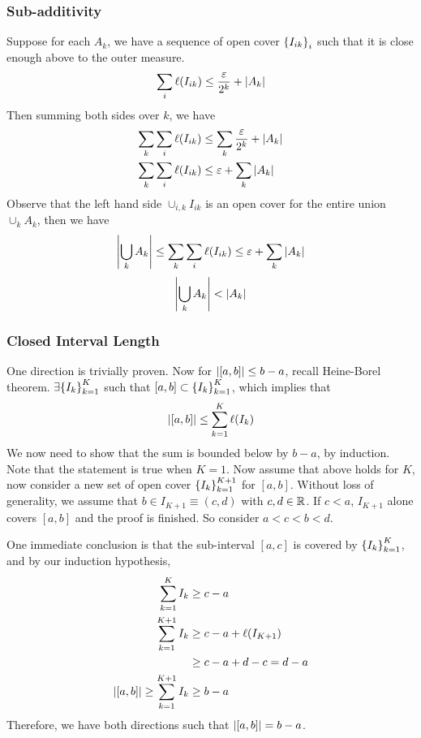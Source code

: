 \subsubsection{Sub-additivity}
\label{prof:subadditivity}
\begin{prf*}
Suppose for each $A_k$, we have a sequence of open cover $\qty{I_{ik}}_i$ such that it is close enough above to the outer measure. 
$$\sum_{i} \ell(I_{ik}) \leq \frac{{\varepsilon}}{2^k} + \abs{A_k}$$
Then summing both sides over $k$, we have
\begin{align*}
	\sum_{k}\sum_{i} \ell(I_{ik}) &\leq \sum_{k} \frac{{\varepsilon}}{2^k} + \abs{A_k}\\
	\sum_{k}\sum_{i} \ell(I_{ik}) &\leq {\varepsilon} + \sum_{k}\abs{A_k}
\end{align*}
Observe that the left hand side $\cup_{i, k} I_{ik}$ is an open cover for the entire union $\cup_k A_k$, then we have
$$ \abs{\bigcup_k A_k} \leq \sum_{k}\sum_{i} \ell(I_{ik}) \leq {\varepsilon} + \sum_{k}\abs{A_k}$$
$$\abs{\bigcup_k A_k} < \abs{A_k}$$
\end{prf*}

\subsubsection{Closed Interval Length}
\label{prof:closed interval}

\begin{prf*}
One direction is trivially proven. Now for $\abs{[a, b]} \leq b - a$, recall Heine-Borel theorem. $\exists \qty{I_k}_{k=1}^K$ such that $[a, b]\subset \qty{I_k}_{k=1}^K$, which implies that 
$$\abs{[a,b]} \leq \sum_{k=1}^K \ell(I_k)$$
We now need to show that the sum is bounded below by $b-a$, by induction. Note that the statement is true when $K = 1$. Now assume that above holds for $K$, now consider a new set of open cover $\qty{I_k}_{k=1}^{K+1}$ for $[a, b]$. Without loss of generality, we assume that $b\in I_{K+1} \equiv (c, d)$ with $c, d\in {\mathbb{R}}$. If $c<a$, $I_{K+1}$ alone covers $[a, b]$ and the proof is finished. So consider $a<c<b<d$.

One immediate conclusion is that the sub-interval $[a, c]$ is covered by $\qty{I_k}_{k=1}^{K}$, and by our induction hypothesis, 
\begin{align*}
	\sum_{k=1}^K I_k &\geq c-a\\
	\sum_{k=1}^{K+1} I_k &\geq c-a +\ell(I_{K+1})\\
	&\geq c-a+d-c = d-a\\
\abs{[a, b]} \geq \sum_{k=1}^{K+1} I_k &\geq b-a
\end{align*}
Therefore, we have both directions such that $\abs{[a, b]} = b-a$. 
\end{prf*}

